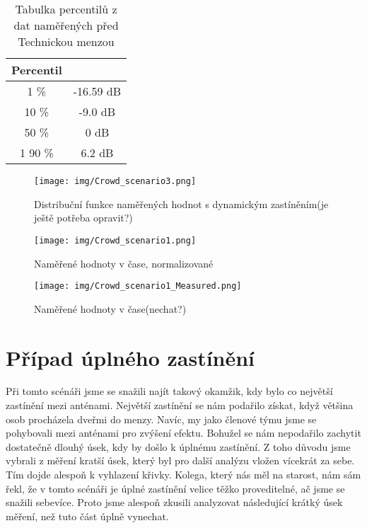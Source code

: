 \begin{table}[h!]
\centering
\begin{tabular}{|c|c|}
  \hline
   Percentil &  \\
  \hline
  1 \% & -16.59 dB\\
  \hline
  10 \% & -9.0 dB\\
  \hline
  50 \% & 0 dB \\
  \hline1 
  90 \% & 6.2 dB \\
  \hline
\end{tabular}
\caption{Tabulka percentilů z dat naměřených před Technickou menzou}
\end{table}

\clearpage


\begin{figure}[h!]
    \centering
    \texttt{[image: img/Crowd\_scenario3.png]}
    \caption{Distribuční funkce naměřených hodnot s dynamickým zastíněním(je ještě potřeba opravit?)}
    \label{fig:my_label}
\end{figure}

\begin{figure}[h!]
    \centering
    \texttt{[image: img/Crowd\_scenario1.png]}
    \caption{Naměřené hodnoty v čase, normalizované}
    \label{fig:my_label}
\end{figure}
\clearpage



\begin{figure}[h!]
    \centering
    \texttt{[image: img/Crowd\_scenario1\_Measured.png]}
    \caption{Naměřené hodnoty v čase(nechat?)}
    \label{fig:my_label}
\end{figure}


\section{Případ úplného zastínění}
Při tomto scénáři jsme se snažili najít takový okamžik, kdy bylo co největší zastínění mezi anténami. Největší zastínění se nám podařilo získat, když většina osob procházela dveřmi do menzy. Navíc, my jako členové týmu jsme se pohybovali mezi anténami pro zvýšení efektu. Bohužel se nám nepodařilo zachytit dostatečně dlouhý úsek, kdy by došlo k úplnému zastínění. Z toho důvodu jsme vybrali z měření kratší úsek, který byl pro další analýzu vložen vícekrát za sebe. Tím dojde alespoň k vyhlazení křivky. Kolega, který nás měl na starost, nám sám řekl, že v tomto scénáři je úplné zastínění velice těžko proveditelné, ač jsme se snažili sebevíce. Proto jsme alespoň zkusili analyzovat následující krátký úsek měření, než tuto část úplně vynechat. 




